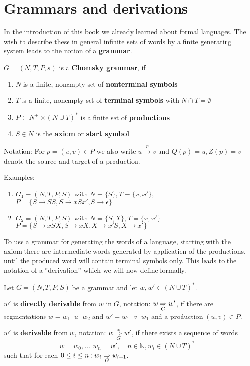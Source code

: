 \section{Grammars and derivations}

In the introduction of this book we already learned about formal languages. The
wish to describe these in general infinite sets of words by a finite generating
system leads to the notion of a {\bf grammar}.

\begin{definition}
$G = (N, T, P, s)$ is a {\bf Chomsky grammar}, if
\begin{enumerate}
  \item $N$ is a finite, nonempty set of {\bf nonterminal symbols}
  \item $T$ is a finite, nonempty set of {\bf terminal symbols} with
  $N \cap T = \emptyset$
  \item $P \subset N^+ \times (N \cup T)^*$ is a finite set of {\bf productions}
  \item $S \in N$ is the {\bf axiom} or {\bf start symbol} 
\end{enumerate}
\end{definition}

Notation: For $p = (u, v) \in P$ we also write $u \stackrel{p}{\to} v$ and
$Q(p) = u, Z(p) = v$ denote the source and target of a production.

Examples:
\begin{enumerate}
  \item $G_1 = (N, T, P, S)$ with $N = \{ S \}, T = \{ x, x' \},$ \\ 
  $P = \{ S \to SS, S \to xSx', S \to \epsilon \}$
  \item $G_2 = (N, T, P, S)$ with $N = \{ S, X \}, T = \{ x, x' \}$ \\
  $P = \{ S \to xSX, S \to xX, X \to x'S, X \to x' \}$
\end{enumerate}

To use a grammar for generating the words of a language, starting with the axiom
there are intermediate words generated by application of the productions, until
the produced word will contain terminal symbols only. This leads to the notation
of a ''derivation'' which we will now define formally.

\begin{definition}
Let $G = (N, T, P, S)$ be a grammar and let $w, w' \in (N \cup T)^*$.

$w'$ is {\bf directly derivable} from $w$ in $G$, notation: $w
\underset{G}{\Rightarrow} w'$, if there are segmentations $w = w_1 \cdot u \cdot w_2$ and
$w' = w_1 \cdot v \cdot w_1$ and a production $(u, v) \in P$.

$w'$ is {\bf derivable} from $w$, notation: $w \underset{G}{\overset{*}{\Rightarrow}} w'$, if there exists
a sequence of words \[ w = w_0, \ldots, w_n = w',\quad n \in \mathbb{N}, w_i \in
(N \cup T)^* \] such that for each $0 \leq i \leq n : w_i \underset{G}{\Rightarrow}
w_{i+1}$.
\end{definition}

